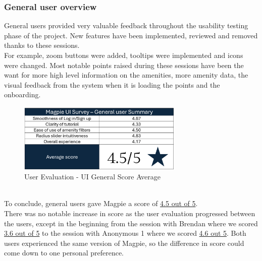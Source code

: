 \subsubsection{General user overview}
General users provided very valuable feedback throughout the usability testing phase of the project. New features have been implemented, reviewed and removed thanks to these sessions.\\
For example, zoom buttons were added, tooltips were implemented and icons were changed.
Most notable points raised during these sessions have been the want for more high level information on the amenities, more amenity data, the visual feedback from the system when it is loading the points and the onboarding.\\
\begin{figure}[h!]
    \centering
    \includegraphics[width=0.7\textwidth]{images/survey-casual-summary.png}
    \caption{User Evaluation - UI General Score Average}
\end{figure}\\
To conclude, general users gave Magpie a score of \underline{4.5 out of 5}.\\
There was no notable increase in score as the user evaluation progressed between the users, except in the beginning from the session with Brendan where we scored \underline{3.6 out of 5} to the session with Anonymous 1 where we scored \underline{4.6 out 5}. Both users experienced the same version of Magpie, so the difference in score could come down to one personal preference.